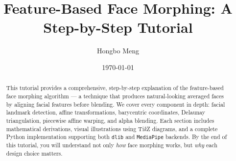 \documentclass[11pt,a4paper]{report}
\title{\vspace{-2em}\Huge\bfseries Feature-Based Face Morphing: A Step-by-Step Tutorial}
\author{\Large Hongbo Meng}
\date{\large \today}
\numberwithin{equation}{section}
\theoremstyle{definition}
\theoremstyle{remark}
\begin{document}
\maketitle

\thispagestyle{empty}
\newpage

\begin{abstract}
This tutorial provides a comprehensive, step-by-step explanation of the feature-based face morphing
algorithm --- a technique that produces natural-looking averaged faces by aligning facial features
before blending. We cover every component in depth: facial landmark detection, affine transformations,
barycentric coordinates, Delaunay triangulation, piecewise affine warping, and alpha blending.
Each section includes mathematical derivations, visual illustrations using Ti\textit{k}Z diagrams,
and a complete Python implementation supporting both \texttt{dlib} and \texttt{MediaPipe} backends.
By the end of this tutorial, you will understand not only \emph{how} face morphing works, but
\emph{why} each design choice matters.
\end{abstract}

\newpage
\tableofcontents
\newpage










% 
% 
\end{document}
